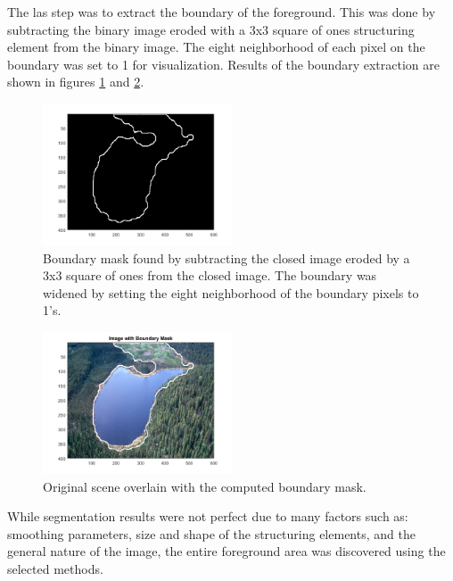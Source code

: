 \documentclass{article}[12 pt]
\begin{document}
\noindent
The las step was to extract the boundary of the foreground.  This was done by subtracting the binary image eroded with a 3x3 square of ones structuring element from the binary image.  The eight neighborhood of each pixel on the boundary was set to 1 for visualization.  Results of the boundary extraction are shown in figures \ref{boundMask} and \ref{segmented}.  

\begin{center}
	\begin{figure}[H]
		\centering
		\includegraphics[width = 0.5\textwidth]{Images/boundaryMask.png}
		\caption{Boundary mask found by subtracting the closed image eroded by a 3x3 square of ones from the closed image.  The boundary was widened by setting the eight neighborhood of the boundary pixels to 1's. }
		\label{boundMask}
	\end{figure}
\end{center}
\begin{center}
	\begin{figure}[H]
		\centering
		\includegraphics[width = 0.5\textwidth]{Images/segmentedScene.png}
		\caption{Original scene overlain with the computed boundary mask.}
		\label{segmented}
	\end{figure}
\end{center}

\noindent
While segmentation results were not perfect due to many factors such as: smoothing parameters, size and shape of the structuring elements, and the general nature of the image, the entire foreground area was discovered using the selected methods. \\
\end{document}
